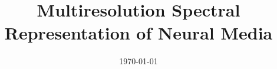 \documentclass[a4paper, 11pt, oneside]{Thesis}  %
\begin{document}
\frontmatter      %

\title  {Multiresolution Spectral Representation of Neural Media}
\addresses  {\groupname\\\deptname\\\univname}  %
\date       {\today}
\subject    {}
\keywords   {}

\maketitle


\fancyhead{}  %
\rhead{\thepage}  %
\lhead{}  %

\pagestyle{fancy}  %




 
 
\end{document}
